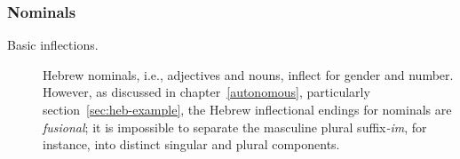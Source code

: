{\subsubsection{Nominals}
\begin{description}
\item[Basic inflections.] Hebrew nominals, i.e., adjectives and nouns, 
inflect for gender and number. However, as discussed in chapter~\ref{autonomous}, 
particularly section~\ref{sec:heb-example}, the Hebrew inflectional endings 
for nominals are \emph{fusional}; it is impossible to separate the masculine plural suffix\textit{-im}, for instance, into 
distinct singular and plural components.

\end{description}}
